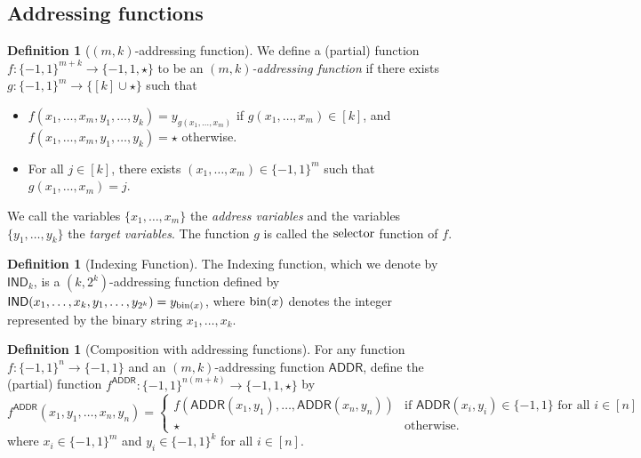 \documentclass[10pt,a4paper]{article}
\theoremstyle{definition}
\newtheorem{definition}[theorem]{Definition}
\newcommand{\bra}[1]{\{#1\}}
\newcommand{\pmone}{\bra{-1,1}}
\newcommand{\ADD}{\mathsf{ADDR}}
\newcommand{\IND}{\mathsf{IND}}
\newcommand{\what}{\textnormal{selector}}
\begin{document}
\subsection{Addressing functions}
\begin{definition}[$(m,k)$-addressing function]\label{defn: add}
We define a (partial) function $f:\pmone^{m+k} \rightarrow \bra{-1, 1, \star}$ to be an \emph{$(m,k)$-addressing function} if there exists $g : \pmone^m \to \bra{[k] \cup \star}$ such that 
\begin{itemize}
    \item $f(x_1, \dots, x_m, y_1, \dots, y_{k}) = y_{g(x_1, \dots, x_m)}$ if $g(x_1, \dots, x_m) \in [k]$, and $f(x_1, \dots, x_m, y_1, \dots, y_{k}) = \star$ otherwise.
    \item For all $j \in [k]$, there exists $(x_1, \dots, x_m) \in \pmone^m$ such that $g(x_1, \dots, x_m) = j$.
\end{itemize}

We call the variables $\{x_1, \dots, x_m\}$ the \emph{address variables} and the variables $\{y_{1}, \dots, y_{k}\}$ the \emph{target variables}.  The function $g$ is called the $\what$ function of $f$.
\end{definition}

\begin{definition}[Indexing Function]
The Indexing function, which we denote by $\IND_k$, is a $(k, 2^k)$-addressing function defined by $\IND(x_1, \dots, x_k, y_1, \dots, y_{2^k}) = y_{\textnormal{bin}(x)}$, where $\textnormal{bin}(x)$ denotes the integer represented by the binary string $x_1, \dots, x_k$.
\end{definition}

\begin{definition}[Composition with addressing functions]\label{defn: addcomp}
For any function $f : \pmone^n \to \pmone$ and an $(m, k)$-addressing function $\ADD$, define the (partial) function $f^{\ADD} : \pmone^{n (m + k)} \to \bra{-1, 1, \star}$ by
\[
f^{\ADD}(x_1, y_1, \dots, x_n, y_n) = 
\begin{cases}
f(\ADD(x_1, y_1), \dots, \ADD(x_n, y_n)) & \text{if~} \ADD(x_i, y_i) \in \pmone \text{~for all~} i \in [n]\\
\star & \text{otherwise}.
\end{cases}
\]
where $x_i \in \pmone^{m}$ and $y_i \in \pmone^k$ for all $i \in [n]$.
\end{definition}
\end{document}
